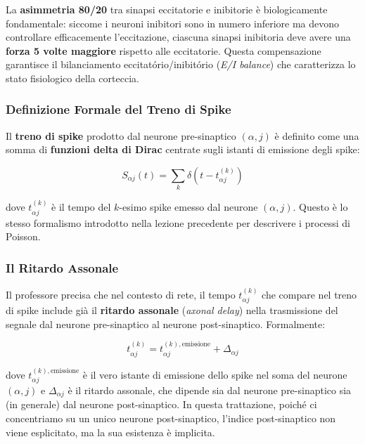La \textbf{asimmetria 80/20} tra sinapsi eccitatorie e inibitorie è biologicamente fondamentale: siccome i neuroni inibitori sono in numero inferiore ma devono controllare efficacemente l'eccitazione, ciascuna sinapsi inibitoria deve avere una \textbf{forza 5 volte maggiore} rispetto alle eccitatorie. Questa compensazione garantisce il bilanciamento eccitatório/inibitório (\textit{E/I balance}) che caratterizza lo stato fisiologico della corteccia.


\subsubsection{Definizione Formale del Treno di Spike}

Il \textbf{treno di spike} prodotto dal neurone pre-sinaptico $(\alpha, j)$ è definito come una somma di \textbf{funzioni delta di Dirac} centrate sugli istanti di emissione degli spike:

\begin{equation}
S_{\alpha j}(t) = \sum_k \delta\!\left(t - t_{\alpha j}^{(k)}\right)
\end{equation}

dove $t_{\alpha j}^{(k)}$ è il tempo del $k$-esimo spike emesso dal neurone $(\alpha, j)$. Questo è lo stesso formalismo introdotto nella lezione precedente per descrivere i processi di Poisson.

\subsubsection{Il Ritardo Assonale}

Il professore precisa che nel contesto di rete, il tempo $t_{\alpha j}^{(k)}$ che compare nel treno di spike include già il \textbf{ritardo assonale} (\textit{axonal delay}) nella trasmissione del segnale dal neurone pre-sinaptico al neurone post-sinaptico. Formalmente:

\begin{equation}
t_{\alpha j}^{(k)} = t_{\alpha j}^{(k),\text{emissione}} + \Delta_{\alpha j}
\end{equation}

dove $t_{\alpha j}^{(k),\text{emissione}}$ è il vero istante di emissione dello spike nel soma del neurone $(\alpha, j)$ e $\Delta_{\alpha j}$ è il ritardo assonale, che dipende sia dal neurone pre-sinaptico sia (in generale) dal neurone post-sinaptico. In questa trattazione, poiché ci concentriamo su un unico neurone post-sinaptico, l'indice post-sinaptico non viene esplicitato, ma la sua esistenza è implicita.



